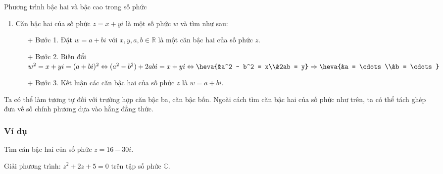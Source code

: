\begin{ex}
\begin{dang}{Phương trình bậc hai và bậc cao trong số phức}
\begin{note}
\begin{enumerate}
			\item Căn bậc hai của số phức $z = x + yi$ là một số phức $w$ và tìm như sau:
			\begin{itemize}
				\item[+] Bước 1. Đặt $w =  a + bi$ với $x, y, a, b \in \mathbb{R}$ là một căn bậc hai của số phức $z$.
				\item[+] Bước 2. Biến đổi $w^2 = x + yi = (a + bi)^2 \Leftrightarrow (a^2 - b^2) + 2abi = x + yi \Leftrightarrow \heva{&a^2 - b^2 = x\\&2ab = y} \Rightarrow \heva{&a = \cdots\\&b = \cdots}$
				\item[+] Bước 3. Kết luận các căn bậc hai của số phức $z$ là $w = a + bi$.
			\end{itemize}
		\end{enumerate}
	\end{note}
	Ta có thể làm tương tự đối với trường hợp căn bậc ba, căn bậc bốn. Ngoài cách tìm căn bậc hai của số phức như trên, ta có thể tách ghép đưa về số chính phương dựa vào hằng đẳng thức.
\end{dang}
\subsubsection{Ví dụ}
\begin{vd}%
	Tìm căn bậc hai của số phức $z = 16 - 30i$. 
\end{vd}

\begin{vd}%
	Giải phương trình: $z^2 + 2z + 5 = 0$ trên tập số phức $\mathbb{C}$. 
\end{vd}

\end{ex}
